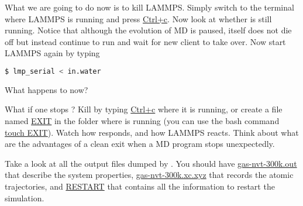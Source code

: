 \documentclass{article}
\begin{document}
\begin{Exercise}[label={i-pi},title={Molecular Dynamics: a client/server approach}]
\Question
What we are going to do now is to kill LAMMPS.
Simply switch to the terminal where LAMMPS is running and press \url{Ctrl+c}.
Now look at whether \ipi{} is still running.
Notice that although the evolution of MD is paused, \ipi{} itself does not die off but instead continue to run and wait for new client to take over.
Now start LAMMPS again by typing
\begin{lstlisting}[language=bash]
$ lmp_serial < in.water
\end{lstlisting}
What happens to \ipi{} now?

\Question
What if one stops \ipi{}? 
Kill \ipi{} by typing \url{Ctrl+c} where it is running, or create a file named \url{EXIT} in the folder where \ipi{} is running
(you can use the bash command \url{touch EXIT}).
Watch how \ipi{} responds, and how LAMMPS reacts.
Think about what are the advantages of a clean exit when a MD program stops unexpectedly.

\Question
Take a look at all the output files dumped by \ipi{}.
You should have \url{gas-nvt-300k.out} that describe the system properties,
\url{gas-nvt-300k.xc.xyz} that records the atomic trajectories,
and \url{RESTART} that contains all the information to restart the simulation. 
\end{Exercise}
\end{document}
